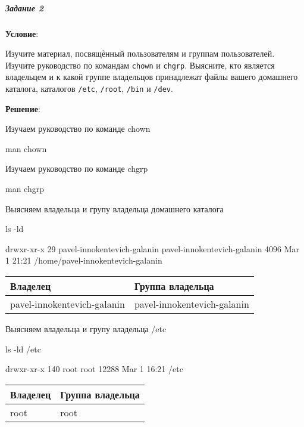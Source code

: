 \newpage

\subparagraph{Задание 2} \textbf{Условие}:

Изучите материал, посвящѐнный пользователям и группам пользователей.
Изучите руководство по командам \verb|chown| и \verb|chgrp|.
Выясните, кто является владельцем и к какой группе владельцов принадлежат файлы вашего домашнего каталога, каталогов \verb|/etc|, \verb|/root|, \verb|/bin| и \verb|/dev|.

\textbf{Решение}:

Изучаем руководство по команде chown

\begin{BashBox}
    man chown
\end{BashBox}

Изучаем руководство по команде chgrp

\begin{BashBox}
    man chgrp
\end{BashBox}

Выясняем владельца и групу владельца домашнего каталога

\begin{BashBox}
    ls -ld ~
\end{BashBox}

\begin{OutBox}
    drwxr-xr-x 29 pavel-innokentevich-galanin pavel-innokentevich-galanin 4096 Mar  1 21:21 /home/pavel-innokentevich-galanin
\end{OutBox}

\begin{table}[h!]
    \centering
    \begin{tabular}{ | l | l | }
        \hline
        Владелец                    & Группа владельца              \\ \hline
        \hline
        pavel-innokentevich-galanin & pavel-innokentevich-galanin   \\ \hline
    \end{tabular}
\end{table}

Выясняем владельца и групу владельца /etc

\begin{BashBox}
    ls -ld /etc
\end{BashBox}

\begin{OutBox}
    drwxr-xr-x 140 root root 12288 Mar  1 16:21 /etc
\end{OutBox}

\begin{table}[h!]
    \centering
    \begin{tabular}{ | l | l | }
        \hline
        Владелец& Группа владельца  \\ \hline
        \hline
        root    & root              \\ \hline
    \end{tabular}
\end{table}

